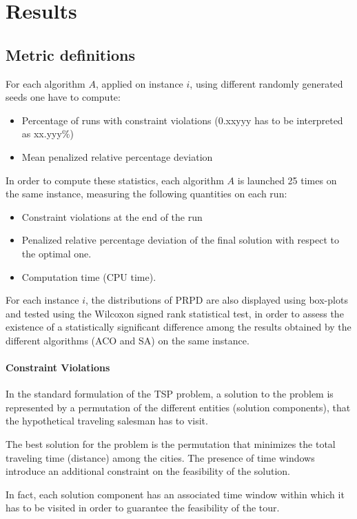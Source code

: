 \section{Results} \label{results}
\subsection{Metric definitions}\label{subsec:metric}
For each algorithm $A$, applied on instance $i$, using different randomly generated seeds one have to compute:
\begin{itemize}
  \item  Percentage of runs with constraint violations (0.xxyyy has to be interpreted as xx.yyy\%)
  \item  Mean penalized relative percentage deviation
\end{itemize}

In order to compute these statistics, each algorithm $A$ is launched 25 times on the same instance, measuring the following quantities on each run:
\begin{itemize}
  \item Constraint violations at the end of the run  
  \item Penalized relative percentage deviation of the final solution with respect to the optimal one.
  \item Computation time (CPU time).
\end{itemize}

For each instance $i$, the distributions of PRPD are also displayed using box-plots and tested using the Wilcoxon signed rank statistical test, in order to assess the existence of a statistically significant difference among the results obtained by the different algorithms (ACO and SA) on the same instance. 

\paragraph{Constraint Violations}
In the standard formulation of the TSP problem, a solution to the problem is represented by a permutation of the different
entities (solution components), that the hypothetical traveling salesman has to visit.

The best solution for the problem is the permutation that minimizes the total traveling time (distance) among the cities.
The presence of time windows introduce an additional constraint on the feasibility of the solution.

In fact, each solution component has an associated time window within which it has to be visited in order to guarantee the feasibility of the tour.

